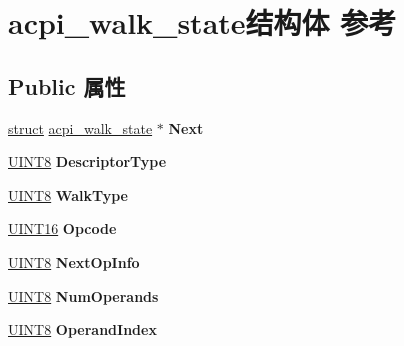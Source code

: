 \hypertarget{structacpi__walk__state}{}\section{acpi\+\_\+walk\+\_\+state结构体 参考}
\label{structacpi__walk__state}
\subsection*{Public 属性}
\begin{DoxyCompactItemize}
\item 
\mbox{\label{structacpi__walk__state_a8ab6735f273f56f137d5c7f198bc3620}} 
\hyperlink{interfacestruct}{struct} \hyperlink{structacpi__walk__state}{acpi\+\_\+walk\+\_\+state} $\ast$ {\bfseries Next}
\item 
\mbox{\label{structacpi__walk__state_aa9c0ee85d6085ec60d68fd1d63503eea}} 
\hyperlink{_processor_bind_8h_ab27e9918b538ce9d8ca692479b375b6a}{U\+I\+N\+T8} {\bfseries Descriptor\+Type}
\item 
\mbox{\label{structacpi__walk__state_afe4393c6b505c68f3ad420757e1ee36f}} 
\hyperlink{_processor_bind_8h_ab27e9918b538ce9d8ca692479b375b6a}{U\+I\+N\+T8} {\bfseries Walk\+Type}
\item 
\mbox{\label{structacpi__walk__state_aaf2eb5e1dd8a251ffd0ec033688bfa9f}} 
\hyperlink{_processor_bind_8h_a09f1a1fb2293e33483cc8d44aefb1eb1}{U\+I\+N\+T16} {\bfseries Opcode}
\item 
\mbox{\label{structacpi__walk__state_a45b547b7b3e5a234a0d07b4e42740c35}} 
\hyperlink{_processor_bind_8h_ab27e9918b538ce9d8ca692479b375b6a}{U\+I\+N\+T8} {\bfseries Next\+Op\+Info}
\item 
\mbox{\label{structacpi__walk__state_adaf759b69cc08331101fa9075063ffaf}} 
\hyperlink{_processor_bind_8h_ab27e9918b538ce9d8ca692479b375b6a}{U\+I\+N\+T8} {\bfseries Num\+Operands}
\item 
\mbox{\label{structacpi__walk__state_a58799f21e24b6f35664566787ce36268}} 
\hyperlink{_processor_bind_8h_ab27e9918b538ce9d8ca692479b375b6a}{U\+I\+N\+T8} {\bfseries Operand\+Index}

\end{DoxyCompactItemize}
